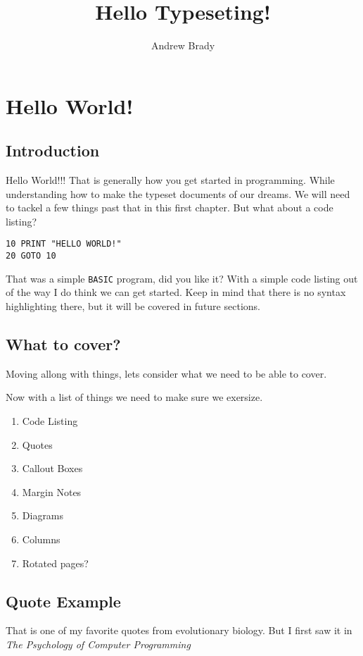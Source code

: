 \documentclass[12pt,A5]{report}
\author{Andrew Brady}
\title{Hello Typeseting!}
\begin{document}
\maketitle
\tableofcontents


\chapter{Hello World!}

\section{Introduction}
Hello World!!! That is generally how you get started in programming. While understanding how to make the typeset documents of our dreams. We will need to tackel a few things past that in this first chapter. \newline But what about a code listing?

\begin{verbatim}
10 PRINT "HELLO WORLD!"
20 GOTO 10
\end{verbatim}

That was a simple \verb|BASIC| program, did you like it? With a simple code listing out of the way I do think we can get started. Keep in mind that there is no syntax highlighting there, but it will be covered in future sections.

\section{What to cover?}
Moving allong with things, lets consider what we need to be able to cover. 

Now with a list of things we need to make sure we exersize.

\begin{multicols*}{3}

\begin{enumerate}
\item Code Listing
\item Quotes
\item Callout Boxes
\item Margin Notes
\item Diagrams
\item Columns
\item Rotated pages?
\end{enumerate}
\end{multicols*}

\section{Quote Example}
That is one of my favorite quotes from evolutionary biology. But I first saw it in \textit{The Psychology of Computer Programming}
\end{document}
